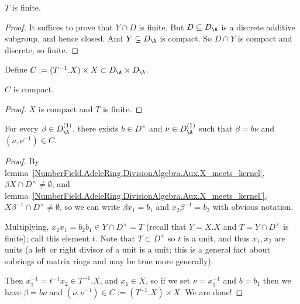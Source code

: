 \begin{lemma}
  \label{NumberField.AdeleRing.DivisionAlgebra.Aux.T_finite}
  $T$ is finite.
\end{lemma}
\begin{proof}
  It suffices to prove that $Y\cap D$ is finite.
    But $D\subseteq D_{\A}$ is a discrete additive subgroup, and hence closed.
    And $Y\subseteq D_{\A}$ is compact.
    So $D\cap Y$ is compact and discrete, so finite.
\end{proof}

\begin{definition}
  \label{NumberField.AdeleRing.DivisionAlgebra.Aux.C}
  Define $C:= (T^{-1}.X) \times X\subset D_{\A}\times D_{\A}$.
\end{definition}

\begin{lemma}
  \label{NumberField.AdeleRing.DivisionAlgebra.Aux.C_compact}
  $C$ is compact.
\end{lemma}
\begin{proof}
   $X$ is compact and $T$ is finite.
\end{proof}

\begin{lemma}
  \label{NumberField.AdeleRing.DivisionAlgebra.Aux.antidiag_mem_C}
  For every $\beta\in D_{\A}^{(1)}$, there exists $b\in D^\times$
  and $\nu\in D_{\A}^{(1)}$ such that $\beta=b\nu$ and $(\nu,\nu^{-1})\in C.$
\end{lemma}
\begin{proof}
  By lemma~\ref{NumberField.AdeleRing.DivisionAlgebra.Aux.X_meets_kernel},
  $\beta X\cap D^\times\not=\emptyset$,
  and lemma~\ref{NumberField.AdeleRing.DivisionAlgebra.Aux.X_meets_kernel'},
  $X\beta^{-1}\cap D^\times\not=\emptyset$,
  so we can write $\beta x_1=b_1$ and $x_2\beta^{-1}=b_2$ with obvious notation.

  Multiplying, $x_2x_1=b_2b_1\in Y\cap D^\times=T$ (recall that $Y=X.X$ and $T=Y\cap D^\times$
  is finite); call this element $t$.
  Note that $T\subset D^\times$ so $t$ is a unit, and thus $x_1,x_2$ are units
  (a left or right divisor of a unit is a unit; this is a general fact about subrings of matrix
  rings and may be true more generally).

  Then $x_1^{-1}=t^{-1}x_2\in T^{-1}.X$, and $x_1\in X$, so if we set $\nu=x_1^{-1}$
  and $b=b_1$ then we have $\beta=b\nu$ and $(\nu,\nu^{-1})\in C := (T^{-1}.X)\times X$.
  We are done!
\end{proof}

